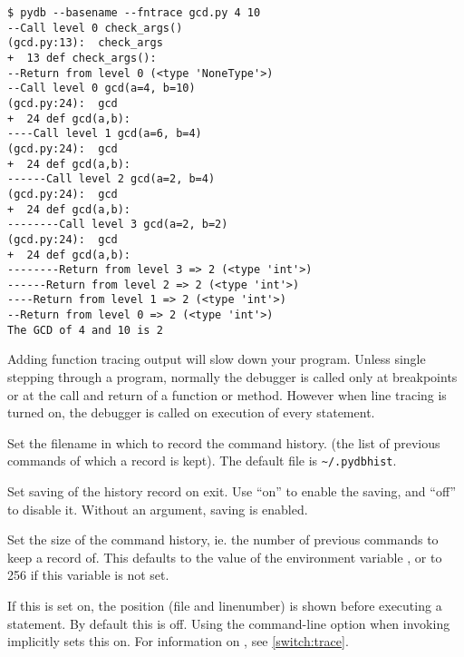 \begin{description}
\begin{verbatim}
$ pydb --basename --fntrace gcd.py 4 10
--Call level 0 check_args()
(gcd.py:13):  check_args
+  13 def check_args():
--Return from level 0 (<type 'NoneType'>)
--Call level 0 gcd(a=4, b=10)
(gcd.py:24):  gcd
+  24 def gcd(a,b):
----Call level 1 gcd(a=6, b=4)
(gcd.py:24):  gcd
+  24 def gcd(a,b):
------Call level 2 gcd(a=2, b=4)
(gcd.py:24):  gcd
+  24 def gcd(a,b):
--------Call level 3 gcd(a=2, b=2)
(gcd.py:24):  gcd
+  24 def gcd(a,b):
--------Return from level 3 => 2 (<type 'int'>)
------Return from level 2 => 2 (<type 'int'>)
----Return from level 1 => 2 (<type 'int'>)
--Return from level 0 => 2 (<type 'int'>)
The GCD of 4 and 10 is 2
\end{verbatim}

Adding function tracing output will slow down your
program. Unless single stepping through a program, normally the
debugger is called only at breakpoints or at the call and return of a
function or method. However when line tracing is turned on, the
debugger is called on execution of every statement. 

\item[set history filename \var{filename}]\label{command:hist-filename}

Set the filename in which to record the command history.
(the list of previous commands of which a record is kept). The default
file is \verb|~/.pydbhist|.

\item[set history save on\code{\Large{|}}off]

Set saving of the history record on exit.  Use ``on'' to enable the
saving, and ``off'' to disable it.  Without an argument, saving is
enabled.

\item[set history size \var{number}]

Set the size of the command history, ie. the number of previous
commands to keep a record of. This defaults to the value of the environment variable
, or to 256 if this variable is not set.

\item[set linetrace on\code{\Large{|}}off]\label{command:linetrace}

If this is set on, the position (file and linenumber) is shown before
executing a statement. By default this is off. Using the command-line
option  when invoking  implicitly sets this
on.  For information on , see \ref{switch:trace}.


\end{description}
